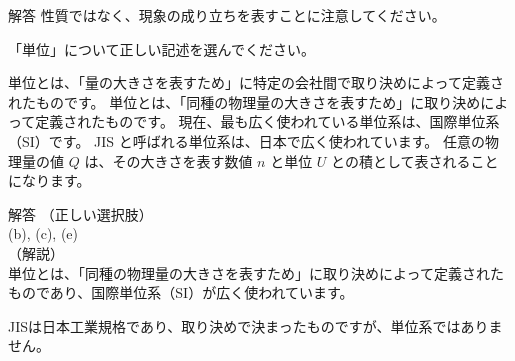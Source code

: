 \documentclass[uplatex,dvipdfmx,a4paper,11pt]{jsarticle}
\begin{document}
\begin{qlist}
\begin{itembox}[l]{解答}
        性質ではなく、現象の成り立ちを表すことに注意してください。
    \end{itembox}
	\qitem 「単位」について正しい記述を選んでください。
		\begin{qlist2}
			\qitem 単位とは、「量の大きさを表すため」に特定の会社間で取り決めによって定義されたものです。
			\qitem 単位とは、「同種の物理量の大きさを表すため」に取り決めによって定義されたものです。
			\qitem 現在、最も広く使われている単位系は、国際単位系（SI）です。
			\qitem JIS と呼ばれる単位系は、日本で広く使われています。
			\qitem 任意の物理量の値 $Q$ は、その大きさを表す数値 $n$ と単位 $U$ との積として表されることになります。
		\end{qlist2}
    \vspace{3mm}
    \begin{itembox}[l]{解答}
        （正しい選択肢）\\
        (b), (c), (e)\\
        （解説）\\
        単位とは、「同種の物理量の大きさを表すため」に取り決めによって定義されたものであり、国際単位系（SI）が広く使われています。
        
        JISは日本工業規格であり、取り決めで決まったものですが、単位系ではありません。
    \end{itembox}
\end{qlist}
\end{document}
